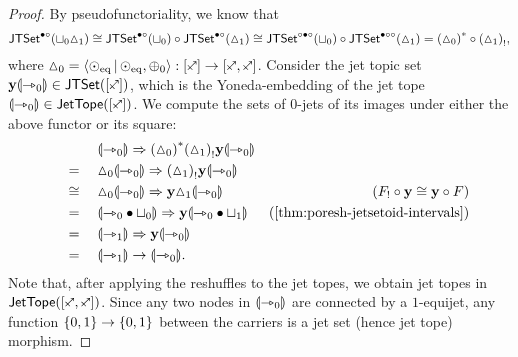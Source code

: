 \documentclass[a4paper]{memoir}
\begin{document}
\begin{proof}
	By pseudofunctoriality, we know that
	\[
		\mathsf{JTSet}^{\bullet \circ}({\sqcup}_0 {\vartriangle}_1)
		\cong \mathsf{JTSet}^{\bullet \circ}({\sqcup}_0) \circ \mathsf{JTSet}^{\bullet \circ}({\vartriangle}_1)
		\cong \mathsf{JTSet}^{\circ \bullet \circ}({\sqcup}_0) \circ \mathsf{JTSet}^{\bullet \circ \circ}({\vartriangle}_1)
		= {({\vartriangle}_0)}^* \circ {({\vartriangle}_1)}_!,
	\]
	where $\cohdisc_0 = \reshlist{\nonpol_\eqtydeg}{\nonpol_\eqtydeg, \pospol_0} : [\ypolar] \to [\ypolar, \ypolar]$.
	Consider the jet topic set $\yoneda \rival{\jetsym_0} \in \jtset{[\ypolar]}$, which is the Yoneda-embedding of the jet tope $\rival{\jetsym_0} \in \jettope{[\ypolar]}$.
	We compute the sets of 0-jets of its images under either the above functor or its square:
	\begin{align*}
		&\quad\mathrel{\phantom{=}}\quad
		\DSub{\rival{\jetsym_0}}{\fpsh{(\cohdisc_0)} \lpsh{(\cohdisc_1)} \yoneda \rival{\jetsym_0}} \\
		&\quad=\quad \DSub{\cohdisc_0 \rival{\jetsym_0}}{\lpsh{(\cohdisc_1)} \yoneda \rival{\jetsym_0}} \\
		&\quad\cong\quad \DSub{\cohdisc_0 \rival{\jetsym_0}}{\yoneda \cohdisc_1 \rival{\jetsym_0}}
		& \text{($\lpsh F \circ \yoneda \cong \yoneda \circ F$)} \\
		&\quad=\quad \DSub{\rival{\jetsym_0 \oriof \cohfget_0}}{\yoneda \rival{\jetsym_0 \oriof \cohfget_1}}
		& \text{(\cref{thm:poresh-jetsetoid-intervals})} \\
		&\quad=\quad \DSub{\rival{\jetsym_1}}{\yoneda \rival{\jetsym_0}} \\
		&\quad=\quad \rival{\jetsym_1} \to \rival{\jetsym_0}.
	\end{align*}
	Note that, after applying the reshuffles to the jet topes, we obtain jet topes in $\jettope{[\ypolar, \ypolar]}$.
	Since any two nodes in ${\llparenthesis {\rightarrowtriangle}_0 \rrparenthesis}$ are connected by a $1$-equijet, any function $\mathopen{}\left\{ 0, 1 \right\}\mathclose{} \to \mathopen{}\left\{ 0, 1 \right\}\mathclose{}$ between the carriers is a jet set (hence jet tope) morphism.
	

\end{proof}
\end{document}
